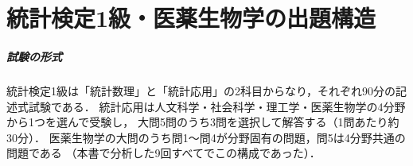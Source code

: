 \chapter*{統計検定1級・医薬生物学の出題構造}

\paragraph{試験の形式}
統計検定1級は「統計数理」と「統計応用」の2科目からなり，それぞれ90分の記述式試験である．
統計応用は人文科学・社会科学・理工学・医薬生物学の4分野から1つを選んで受験し，
大問5問のうち3問を選択して解答する（1問あたり約30分）\cite{web:lec,web:academaid}．
医薬生物学の大問のうち問1〜問4が分野固有の問題，問5は4分野共通の問題である
（本書で分析した9回すべてでこの構成であった）．

